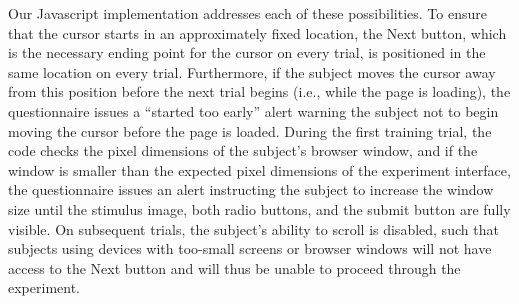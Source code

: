 \documentclass[]{article}
\begin{document}
Our Javascript implementation addresses each of these possibilities. To
ensure that the cursor starts in an approximately fixed location, the
Next button, which is the necessary ending point for the cursor on every
trial, is positioned in the same location on every trial. Furthermore,
if the subject moves the cursor away from this position before the next
trial begins (i.e., while the page is loading), the questionnaire issues
a ``started too early'' alert warning the subject not to begin moving
the cursor before the page is loaded. During the first training trial,
the code checks the pixel dimensions of the subject's browser window,
and if the window is smaller than the expected pixel dimensions of the
experiment interface, the questionnaire issues an alert instructing the
subject to increase the window size until the stimulus image, both radio
buttons, and the submit button are fully visible. On subsequent trials,
the subject's ability to scroll is disabled, such that subjects using
devices with too-small screens or browser windows will not have access
to the Next button and will thus be unable to proceed through the
experiment.
\end{document}
